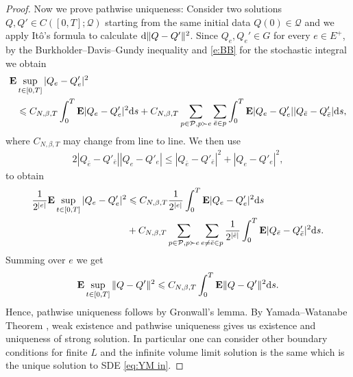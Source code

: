 \documentclass[11pt,UTF-8,reqno]{amsart}
\numberwithin{equation}{section}
\def\dif{{\mathord{{\rm d}}}}
\def\cP{{\mathcal P}}
\def\cQ{{\mathcal Q}}
\def\E{\mathbf E}
\def\leq{\leqslant}
\def\E{\mathbf{E}}
\def\dif{{\mathord{{\rm d}}}}
\def\leq{\leqslant}
\begin{document}
\begin{proof}
Now we prove pathwise uniqueness:
Consider two solutions  $Q, Q'\in C([0,T];\cQ)$ starting from the same initial data $Q(0)\in \cQ$ and we apply It\^o's formula to calculate $\dif \|Q-Q'\|^2$. Since $Q_e, Q_e'\in G$ for every $e\in E^+$,
by the Burkholder--Davis--Gundy inequality  and \eqref{e:BB} for the stochastic integral we obtain
\begin{align*}
\E & \sup_{t\in [0,T]}|Q_e-Q'_e|^2
\\
&\leq C_{N,\beta,T}\int_0^T\E|Q_e-Q'_e|^2\dif s+C_{N,\beta,T}\sum_{p\in \cP,p\succ e}\sum_{\bar e\in p}\int_0^T\E|Q_e-Q'_e||Q_{\bar e}-Q'_{\bar e}|\dif s,
\end{align*}
where $C_{N,\beta,T}$ may change from line to line.
We then use
\begin{align*}
	2|Q_{\bar e}-Q'_{\bar e}||Q_e-Q'_e|\leq |Q_{\bar e}-Q'_{\bar e}|^2+|Q_e-Q'_e|^2,
\end{align*}
to obtain
\begin{align*}
	\frac1{2^{|e|}}\E\sup_{t\in [0,T]}|Q_e-Q'_e|^2
	&\leq C_{N,\beta,T} \frac1{2^{|e|}}\int_0^T\E|Q_e-Q'_e|^2\dif s
	\\
	&+C_{N,\beta,T}\sum_{p\in \cP, p\succ e}\sum_{e\neq \bar e\in p}\frac1{2^{|\bar e|}}\int_0^T\E|Q_{\bar e}-Q'_{\bar e}|^2\dif s.
\end{align*}
Summing over $e$ we get
	\begin{align*}
		\E\sup_{t\in [0,T]}\|Q-Q'\|^2\leq C_{N,\beta,T} \int_0^T\E\|Q-Q'\|^2\dif s.
	\end{align*}
Hence, pathwise uniqueness follows by Gronwall's lemma.
By Yamada--Watanabe Theorem \cite{Kurtz},
weak existence and pathwise uniqueness gives us  existence and uniqueness of strong solution.
In particular one can consider other boundary conditions for finite $L$ and the infinite volume limit solution is the same which is the unique solution to SDE \eqref{eq:YM in}.
\end{proof}
\end{document}
